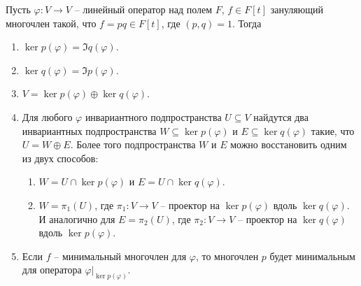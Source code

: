 \begin{claim}
\label{claim::IdealRootDec}
Пусть $\varphi\colon V\to V$ -- линейный оператор над полем $F$, $f\in F[t]$ зануляющий многочлен такой, что $f = p q \in F[t]$, где $(p, q) = 1$.
Тогда
\begin{enumerate}
\item $\ker p(\varphi) = \Im q(\varphi)$.

\item $\ker q(\varphi) = \Im p(\varphi)$.

\item $V = \ker p(\varphi) \oplus \ker q(\varphi)$.

\item Для любого $\varphi$ инвариантного подпространства $U\subseteq V$ найдутся два инвариантных подпространства $W \subseteq \ker p(\varphi)$ и $E\subseteq \ker q(\varphi)$ такие, что $U = W \oplus E$.
Более того подпространства $W$ и $E$ можно восстановить одним из двух способов:
\begin{enumerate}
\item $W = U \cap \ker p(\varphi)$ и $E = U\cap \ker q(\varphi)$.

\item $W = \pi_1(U)$, где $\pi_1\colon V\to V$ -- проектор на $\ker p(\varphi)$ вдоль $\ker q(\varphi)$.
И аналогично для $E = \pi_2(U)$, где $\pi_2\colon V\to V$ -- проектор на $\ker q(\varphi)$ вдоль $\ker p(\varphi)$.
\end{enumerate}

\item Если $f$ -- минимальный многочлен для $\varphi$, то  многочлен $p$ будет минимальным для оператора $\varphi|_{\ker p(\varphi)}$.

\end{enumerate}
\end{claim}
